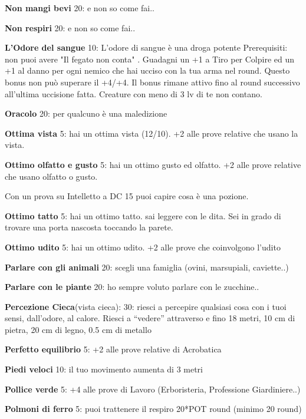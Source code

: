 \documentclass[a4paper,11pt,twoside,openany]{book}
\begin{document}
\textbf{Non mangi bevi} 20: e non so come fai..

\textbf{Non respiri} 20: e non so come fai..

\textbf{L'Odore del sangue} 10: L'odore di sangue è una droga potente
Prerequisiti: non puoi avere "Il fegato non conta" . Guadagni un +1 a Tiro per Colpire ed un +1 al danno per ogni nemico che hai ucciso con la tua arma nel round. Questo bonus non può superare il +4/+4. Il bonus rimane attivo fino al round successivo all'ultima uccisione fatta. Creature con meno di 3 lv di te non contano.

\textbf{Oracolo} 20: per qualcuno è una maledizione

\textbf{Ottima vista} 5: hai un ottima vista (12/10). +2 alle prove relative che usano la vista.

\textbf{Ottimo olfatto e gusto} 5: hai un ottimo gusto ed olfatto. +2 alle prove relative che usano olfatto o gusto.

Con un prova su Intelletto a DC 15 puoi capire cosa è una pozione.

\textbf{Ottimo tatto} 5: hai un ottimo tatto. sai leggere con le dita. Sei in grado di trovare una porta nascosta toccando la parete.

\textbf{Ottimo udito} 5: hai un ottimo udito. +2 alle prove che coinvolgono l'udito

\textbf{Parlare con gli animali} 20: scegli una famiglia (ovini, marsupiali, caviette..)

\textbf{Parlare con le piante} 20: ho sempre voluto parlare con le zucchine..

\textbf{Percezione Cieca}(vista cieca): 30: riesci a percepire qualsiasi cosa con i tuoi sensi, dall’odore, al calore. Riesci a “vedere” attraverso e fino 18 metri, 10 cm di pietra, 20 cm di legno, 0.5 cm di metallo

\textbf{Perfetto equilibrio} 5: +2 alle prove relative di Acrobatica

\textbf{Piedi veloci} 10: il tuo movimento aumenta di 3 metri

\textbf{Pollice verde} 5: +4 alle prove di Lavoro (Erboristeria, Professione Giardiniere..)

\textbf{Polmoni di ferro} 5: puoi trattenere il respiro 20*POT round (minimo 20 round)
\end{document}

